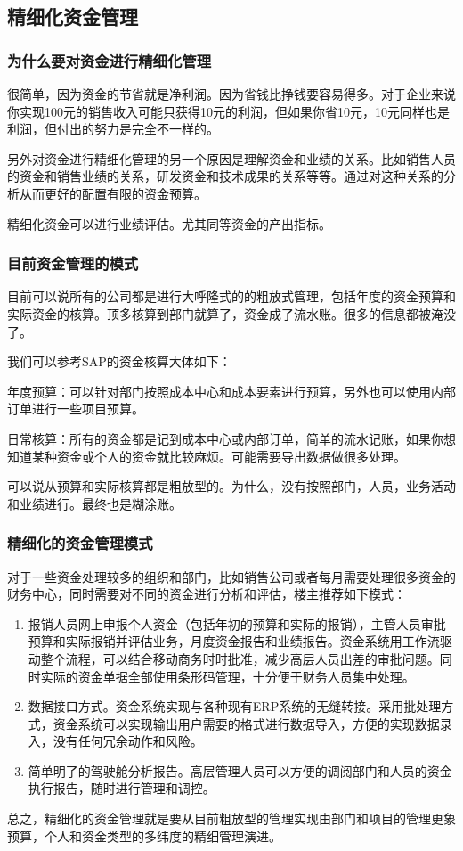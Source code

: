 \subsection {精细化资金管理}

    \subsubsection {为什么要对资金进行精细化管理}

    很简单，因为资金的节省就是净利润。因为省钱比挣钱要容易得多。对于企业来说你实现100元的销售收入可能只获得10元的利润，但如果你省10元，10元同样也是利润，但付出的努力是完全不一样的。

    另外对资金进行精细化管理的另一个原因是理解资金和业绩的关系。比如销售人员的资金和销售业绩的关系，研发资金和技术成果的关系等等。通过对这种关系的分析从而更好的配置有限的资金预算。

    精细化资金可以进行业绩评估。尤其同等资金的产出指标。

    \subsubsection {目前资金管理的模式}

    目前可以说所有的公司都是进行大呼隆式的的粗放式管理，包括年度的资金预算和实际资金的核算。顶多核算到部门就算了，资金成了流水账。很多的信息都被淹没了。

    我们可以参考SAP的资金核算大体如下：

    年度预算：可以针对部门按照成本中心和成本要素进行预算，另外也可以使用内部订单进行一些项目预算。

    日常核算：所有的资金都是记到成本中心或内部订单，简单的流水记账，如果你想知道某种资金或个人的资金就比较麻烦。可能需要导出数据做很多处理。

    可以说从预算和实际核算都是粗放型的。为什么，没有按照部门，人员，业务活动和业绩进行。最终也是糊涂账。

    \subsubsection {精细化的资金管理模式}

    对于一些资金处理较多的组织和部门，比如销售公司或者每月需要处理很多资金的财务中心，同时需要对不同的资金进行分析和评估，楼主推荐如下模式：

    \begin{enumerate}
        \item  报销人员网上申报个人资金（包括年初的预算和实际的报销），主管人员审批预算和实际报销并评估业务，月度资金报告和业绩报告。资金系统用工作流驱动整个流程，可以结合移动商务时时批准，减少高层人员出差的审批问题。同时实际的资金单据全部使用条形码管理，十分便于财务人员集中处理。

        \item  数据接口方式。资金系统实现与各种现有ERP系统的无缝转接。采用批处理方式，资金系统可以实现输出用户需要的格式进行数据导入，方便的实现数据录入，没有任何冗余动作和风险。

        \item  简单明了的驾驶舱分析报告。高层管理人员可以方便的调阅部门和人员的资金执行报告，随时进行管理和调控。
    \end{enumerate}

    总之，精细化的资金管理就是要从目前粗放型的管理实现由部门和项目的管理更象预算，个人和资金类型的多纬度的精细管理演进。
